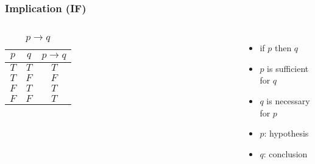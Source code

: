 \documentclass[dvipsnames]{beamer}
\begin{document}
\begin{frame}
  \frametitle{Implication (IF)}

  \begin{columns}
    \begin{table}
      \caption{$p \rightarrow q$}
      \begin{tabular}{|c|c||c|}\hline
        $p$ & $q$ & $p \rightarrow q$\\\hline\hline
        $T$ & $T$ & $T$\\\hline
        $T$ & $F$ & $F$\\\hline
        $F$ & $T$ & $T$\\\hline
        $F$ & $F$ & $T$\\\hline
      \end{tabular}
    \end{table}

    \begin{itemize}
      \item if $p$ then $q$
      \smallskip
      \item $p$ is sufficient for $q$
      \item $q$ is necessary for $p$

      \medskip
      \item $p$: \alert{hypothesis}
      \item $q$: \alert{conclusion}
    \end{itemize}
  \end{columns}
\end{frame}
\end{document}
